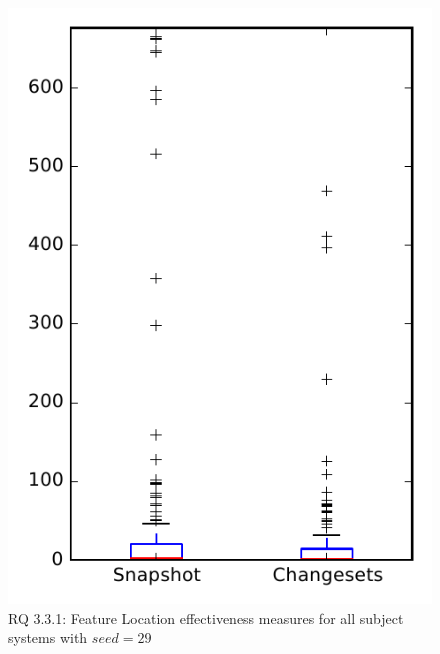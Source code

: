 
\begin{figure}
\centering
\includegraphics[height=0.4\textheight]{figures/flt_seed/rq1_overview_29}
\caption{RQ 3.3.1: Feature Location effectiveness measures for all subject systems with $seed=29$}
\label{fig:flt_seed:rq1:overview}
\end{figure}
